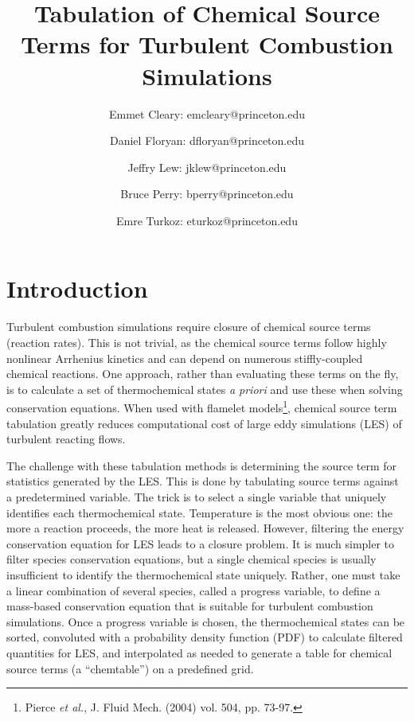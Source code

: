 \documentclass[11pt]{article}
\begin{document}
\title{\textbf{Tabulation of Chemical Source Terms for Turbulent
    Combustion Simulations}}

\author{Emmet Cleary: emcleary@princeton.edu \and Daniel Floryan:
  dfloryan@princeton.edu \and Jeffry Lew: jklew@princeton.edu \and
  Bruce Perry: bperry@princeton.edu \and Emre Turkoz:
  eturkoz@princeton.edu} 

\maketitle

\section{Introduction}
Turbulent combustion simulations require closure of chemical source
terms (reaction rates). This is not trivial, as the chemical source
terms follow highly nonlinear Arrhenius kinetics and can depend on
numerous stiffly-coupled chemical reactions. One approach, rather than
evaluating these terms on the fly, is to calculate a set of
thermochemical states \textit{a priori} and use these when solving
conservation equations. When used with flamelet models\footnote{Pierce
  \textit{et al.}, J. Fluid Mech. (2004) vol. 504, pp. 73-97.},
chemical source term tabulation greatly reduces computational cost of
large eddy simulations (LES) of turbulent reacting flows.

The challenge with these tabulation methods is determining the source
term for statistics generated by the LES.  This is done by tabulating
source terms against a predetermined variable. The trick is to select
a single variable that uniquely identifies each thermochemical
state. Temperature is the most obvious one: the more a reaction
proceeds, the more heat is released. However, filtering the energy
conservation equation for LES leads to a closure problem. It is much
simpler to filter species conservation equations, but a single
chemical species is usually insufficient to identify the
thermochemical state uniquely. Rather, one must take a linear
combination of several species, called a progress variable, to define
a mass-based conservation equation that is suitable for turbulent
combustion simulations. Once a progress variable is chosen, the
thermochemical states can be sorted, convoluted with a probability
density function (PDF) to calculate filtered quantities for LES, and
interpolated as needed to generate a table for chemical source terms
(a “chemtable”) on a predefined grid.
\end{document}
